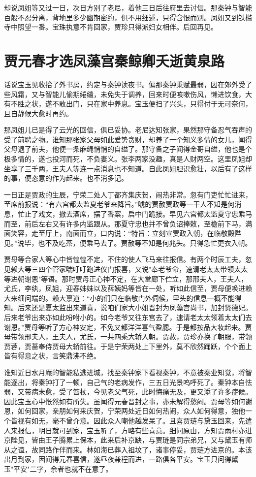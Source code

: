 却说凤姐等又过一日，次日方别了老尼，着他三日后往府里去讨信。那秦钟与智能百般不忍分离，背地里多少幽期密约，俱不用细述，只得含恨而别。凤姐又到铁槛寺中照望一番。宝珠执意不肯回家，贾珍只得派妇女相伴。后回再见。

\chapter{贾元春才选凤藻宫\ttlbreak 秦鲸卿夭逝黄泉路}

话说宝玉见收拾了外书房，约定与秦钟读夜书。偏那秦钟秉赋最弱，因在郊外受了些风霜，又与智能儿偷期绻缱，未免失于调养，回来时便咳嗽伤风，懒进饮食，大有不胜之状，遂不敢出门，只在家中养息。宝玉便扫了兴头，只得付于无可奈何，且自静候大愈时再约。

那凤姐儿已是得了云光的回信，俱已妥协。老尼达知张家，果然那守备忍气吞声的受了前聘之物。谁知那张家父母如此爱势贪财，却养了一个知义多情的女儿，闻得父母退了前夫，他便一条麻绳悄悄的自缢了。那守备之子闻得金哥自缢，他也是个极多情的，遂也投河而死，不负妻义。张李两家没趣，真是人财两空。这里凤姐却坐享了三千两，王夫人等连一点消息也不知道。自此凤姐胆识愈壮，以后有了这样的事，便恣意的作为起来。也不消多记。

一日正是贾政的生辰，宁荣二处人丁都齐集庆贺，闹热非常。忽有门吏忙忙进来，至席前报说：“有六宫都太监夏老爷来降旨。”唬的贾赦贾政等一干人不知是何消息，忙止了戏文，撤去酒席，摆了香案，启中门跪接。早见六宫都太监夏守忠乘马而至，前后左右又有许多内监跟从。那夏守忠也并不曾负诏捧敕，至檐前下马，满面笑容，走至厅上，南面而立，口内说：“特旨：立刻宣贾政入朝，在临敬殿陛见。”说毕，也不及吃茶，便乘马去了。贾赦等不知是何兆头。只得急忙更衣入朝。

贾母等合家人等心中皆惶惶不定，不住的使人飞马来往报信。有两个时辰工夫，忽见赖大等三四个管家喘吁吁跑进仪门报喜，又说"奉老爷命，速请老太太带领太太等进朝谢恩"等语。那时贾母正心神不定，在大堂廊下伫立，那邢夫人，王夫人，尤氏，李纨，凤姐，迎春姊妹以及薛姨妈等皆在一处，听如此信至，贾母便唤进赖大来细问端的。赖大禀道：“小的们只在临敬门外伺候，里头的信息一概不能得知。后来还是夏太监出来道喜，说咱们家大小姐晋封为凤藻宫尚书，加封贤德妃。后来老爷出来亦如此吩咐小的。如今老爷又往东宫去了，速请老太太领着太太们去谢恩。”贾母等听了方心神安定，不免又都洋洋喜气盈腮。于是都按品大妆起来。贾母带领邢夫人，王夫人，尤氏，一共四乘大轿入朝。贾赦，贾珍亦换了朝服，带领贾蓉，贾蔷奉侍贾母大轿前往。于是宁荣两处上下里外，莫不欣然踊跃，个个面上皆有得意之状，言笑鼎沸不绝。

谁知近日水月庵的智能私逃进城，找至秦钟家下看视秦钟，不意被秦业知觉，将智能逐出，将秦钟打了一顿，自己气的老病发作，三五日光景呜呼死了。秦钟本自怯弱，又带病未愈，受了笞杖，今见老父气死，此时悔痛无及，更又添了许多症候。因此宝玉心中怅然如有所失。虽闻得元春晋封之事，亦未解得愁闷。贾母等如何谢恩，如何回家，亲朋如何来庆贺，宁荣两处近日如何热闹，众人如何得意，独他一个皆视有如无，毫不曾介意。因此众人嘲他越发呆了。且喜贾琏与黛玉回来，先遣人来报信，明日就可到家，宝玉听了，方略有些喜意。细问原由，方知贾雨村亦进京陛见，皆由王子腾累上保本，此来后补京缺，与贾琏是同宗弟兄，又与黛玉有师从之谊，故同路作伴而来。林如海已葬入祖坟了，诸事停妥，贾琏方进京的。本该出月到家，因闻得元春喜信，遂昼夜兼程而进，一路俱各平安。宝玉只问得黛玉"平安"二字，余者也就不在意了。

